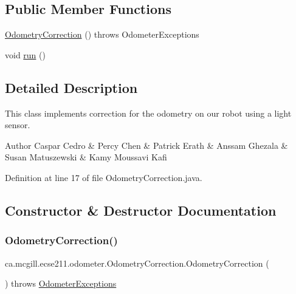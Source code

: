 \subsection*{Public Member Functions}
\begin{DoxyCompactItemize}
\item 
\hyperlink{classca_1_1mcgill_1_1ecse211_1_1odometer_1_1_odometry_correction_ad80b45e0bc4bf935494e075edcec739c}{Odometry\+Correction} ()  throws Odometer\+Exceptions 
\item 
void \hyperlink{classca_1_1mcgill_1_1ecse211_1_1odometer_1_1_odometry_correction_aad66a7030ac00f3a9cbe7bc33c25acbf}{run} ()
\end{DoxyCompactItemize}


\subsection{Detailed Description}
This class implements correction for the odometry on our robot using a light sensor.

\begin{DoxyAuthor}{Author}
Caspar Cedro \& Percy Chen \& Patrick Erath \& Anssam Ghezala \& Susan Matuszewski \& Kamy Moussavi Kafi 
\end{DoxyAuthor}


Definition at line 17 of file Odometry\+Correction.\+java.



\subsection{Constructor \& Destructor Documentation}
\mbox{\label{classca_1_1mcgill_1_1ecse211_1_1odometer_1_1_odometry_correction_ad80b45e0bc4bf935494e075edcec739c}} 
\subsubsection{\texorpdfstring{Odometry\+Correction()}{OdometryCorrection()}}
{\footnotesize\ttfamily ca.\+mcgill.\+ecse211.\+odometer.\+Odometry\+Correction.\+Odometry\+Correction (\begin{DoxyParamCaption}{ }\end{DoxyParamCaption}) throws \hyperlink{classca_1_1mcgill_1_1ecse211_1_1odometer_1_1_odometer_exceptions}{Odometer\+Exceptions}}

